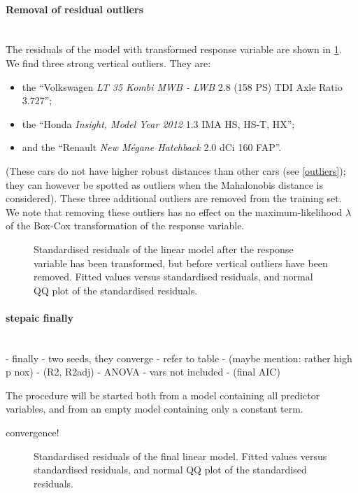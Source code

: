\documentclass[a4paper, 12pt]{article}
\newcommand{\car}[3]{``#1 \textit{#2} #3''}
\newcommand{\wide}[1]{\makebox[\textwidth][c]{#1}%
}
\newcommand{\widedoublefig}[2]{\wide{
  \centering
  \begin{subfigure}[b]{0.65\textwidth}
    \texttt{[image: \#1]}
  \end{subfigure}
  \begin{subfigure}[b]{0.65\textwidth}
    \texttt{[image: \#2]}
  \end{subfigure}
  }
}
\begin{document}
\paragraph{Removal of residual outliers}\leavevmode\\
The residuals of the model with transformed response variable are shown in \cref{post-bc-response_pre-removal}. We find three strong vertical outliers. They are:
\begin{itemize}[topsep=0pt,itemsep=0pt]
  \item the \car{Volkswagen}{LT 35 Kombi MWB - LWB}{2.8 (158 PS) TDI Axle Ratio 3.727};
  \item the \car{Honda}{Insight, Model Year 2012}{1.3 IMA HS, HS-T, HX};
  \item and the \car{Renault}{New M\'egane Hatchback}{2.0 dCi 160 FAP}.
\end{itemize}
(These cars do not have higher robust distances than other cars (see \cref{outliers}); they can however be spotted as outliers when the Mahalonobis distance is considered). These three additional outliers are removed from the training set. We note that removing these outliers has no effect on the maximum-likelihood $\lambda$ of the Box-Cox transformation of the response variable.

\begin{figure}
  \widedoublefig
  {img/post-bc-response_pre-removal_fitted-stdres}
  {img/post-bc-response_pre-removal_qq}
  \caption{Standardised residuals of the linear model after the response variable has been transformed, but before vertical outliers have been removed. Fitted values versus standardised residuals, and normal QQ plot of the standardised residuals.}
  \label{post-bc-response_pre-removal}
\end{figure}

\paragraph{stepaic finally}\leavevmode\\
- finally
- two seeds, they converge
- refer to table
- (maybe mention: rather high p nox)
- (R2, R2adj)
- ANOVA
- vars not included
- (final AIC)

The procedure will be started both from a model containing all predictor variables, and from an empty model containing only a constant term.

convergence!

\begin{figure}
  \widedoublefig
  {img/post-bc-response_post-removal_fitted-stdres}
  {img/post-bc-response_post-removal_qq}
  \caption{Standardised residuals of the final linear model. Fitted values versus standardised residuals, and normal QQ plot of the standardised residuals.}
  \label{post-bc-response_post-removal}
\end{figure}
\end{document}

